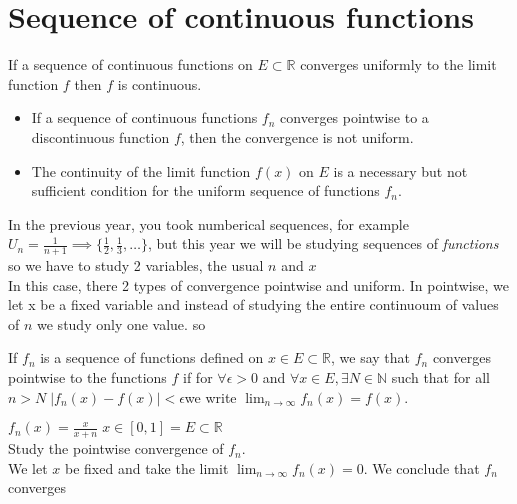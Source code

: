 \section{Sequence of continuous functions}
\begin{theorem}
    If a sequence of continuous functions on $E\subset \mathbb{R}$ converges uniformly to the limit function $f$ then $f$ is continuous.
\end{theorem}

\begin{remark}
    \begin{itemize}
        \item If a sequence of continuous functions $f_n$ converges pointwise to a discontinuous function $f$, then the convergence is not uniform.
        \item The continuity of the limit function $f(x)$ on $E$ is a necessary but not sufficient condition for the uniform sequence of functions $f_n$.
    \end{itemize}
\end{remark}

In the previous year, you took numberical sequences, for example $U_n=\frac{1}{n+1}\implies \{\frac{1}{2},\frac{1}{3},\ldots\} $, but this year we will be studying sequences of \emph{functions} so we have to study 2 variables, the usual $n$ and $x$\\
In this case, there 2 types of convergence pointwise and uniform. In pointwise, we let x be a fixed variable and instead of studying the entire continuoum of values of $n$ we study only one value. so
\begin{definition}
    If $f_n$ is a sequence of functions defined on $x\in E\subset \mathbb{R}$, we say that $f_n$ converges pointwise to the functions $f$ if for $\forall \epsilon>0$ and $\forall x\in E, \exists N\in \mathbb{N}$ such that for all $n>N \; \left|f_n(x )-f(x)\right|<\epsilon$we write $\lim_{n \to \infty} f_n(x)=f(x)$.
\end{definition}
\begin{example}
    $f_n(x)=\frac{x}{x+n} \; x\in[0,1]=E\subset \mathbb{R}$\\
    Study the pointwise convergence of $f_n$.\\
    We let $x$ be fixed and take the limit $\lim_{n \to \infty}f_n(x)=0 $. We conclude that $f_n$ converges 
\end{example}

